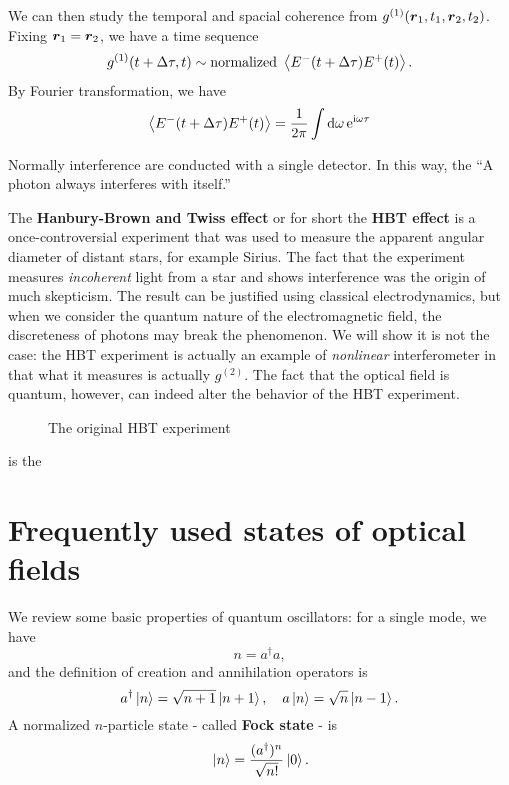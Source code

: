 \documentclass[hyperref, a4paper]{article}
\newcommand*{\ii}{\mathrm{i}}
\newcommand*{\ee}{\mathrm{e}}
\newcommand*{\concept}[1]{{\textbf{#1}}}
\begin{document}
We can then study the temporal and spacial coherence from $g^{(1)}(\vb*{r}_1, t_1, \vb*{r}_2, t_2)$.
Fixing $\vb*{r}_1 = \vb*{r}_2$, we have a time sequence 
\[
    g^{(1)}(t + \Delta \tau, t) \sim \text{normalized } \expval{E^-(t + \Delta\tau) E^+(t) }.
\]
By Fourier transformation, we have 
\[
    \expval{E^-(t + \Delta\tau) E^+(t) } = \frac{1}{2\pi} \int \dd{\omega} \ee^{\ii \omega \tau} 
\]

Normally interference are conducted with a single detector. In this way, the 
``A photon always interferes with itself.'' 

The \concept{Hanbury-Brown and Twiss effect} or for short the \concept{HBT effect} is a once-controversial experiment that was used to measure the apparent angular diameter of distant stars, for example Sirius.
The fact that the experiment measures \emph{incoherent} light from a star and shows interference was the origin of much skepticism.
The result can be justified using classical electrodynamics, but when we consider the quantum nature of the electromagnetic field, 
the discreteness of photons may break the phenomenon. 
We will show it is not the case: the HBT experiment is actually an example of \emph{nonlinear} interferometer in that what it measures is actually $g^{(2)}$.
The fact that the optical field is quantum, however, can indeed alter the behavior of the HBT experiment.

\begin{figure}
    \centering
    
    \caption{The original HBT experiment}
    \label{fig:original-hbt}
\end{figure}

 is the 

\section{Frequently used states of optical fields}

We review some basic properties of quantum oscillators: for a single mode, we have 
\begin{equation}
    n = a^\dagger a,
\end{equation}
and the definition of creation and annihilation operators is
\begin{equation}
    a^\dagger \ket*{n} = \sqrt{n+1} \ket*{n+1}, \quad a \ket*{n} = \sqrt{n} \ket*{n-1}.
\end{equation}
A normalized $n$-particle state - called \concept{Fock state} - is 
\begin{equation}
    \ket*{n} = \frac{(a^\dagger)^n}{\sqrt{n!}} \ket*{0}.
\end{equation}
\end{document}
